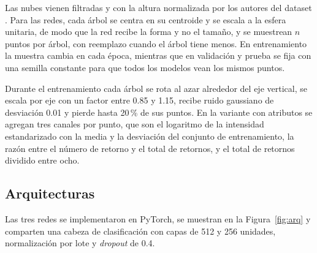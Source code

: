 \documentclass[preprint,12pt]{elsarticle}
\begin{document}
Las nubes vienen filtradas y con la altura normalizada por los autores del dataset \cite{hamdani2026urbantree3d}. Para las redes, cada árbol se centra en su centroide y se escala a la esfera unitaria, de modo que la red recibe la forma y no el tamaño, y se muestrean $n$ puntos por árbol, con reemplazo cuando el árbol tiene menos. En entrenamiento la muestra cambia en cada época, mientras que en validación y prueba se fija con una semilla constante para que todos los modelos vean los mismos puntos.

Durante el entrenamiento cada árbol se rota al azar alrededor del eje vertical, se escala por eje con un factor entre 0.85 y 1.15, recibe ruido gaussiano de desviación 0.01 y pierde hasta 20\,\% de sus puntos. En la variante con atributos se agregan tres canales por punto, que son el logaritmo de la intensidad estandarizado con la media y la desviación del conjunto de entrenamiento, la razón entre el número de retorno y el total de retornos, y el total de retornos dividido entre ocho.

\subsection{Arquitecturas}

Las tres redes se implementaron en PyTorch, se muestran en la Figura~\ref{fig:arq} y comparten una cabeza de clasificación con capas de 512 y 256 unidades, normalización por lote y \textit{dropout} de 0.4.
\end{document}
